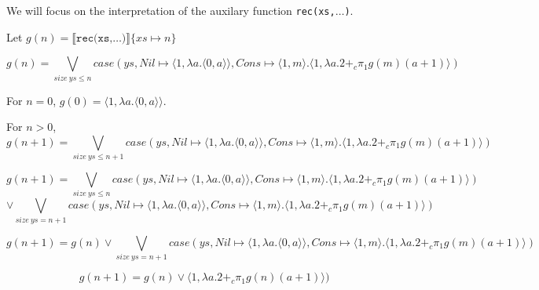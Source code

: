 \documentclass[12pt,letterpaper]{article}
\begin{document}
We will focus on the interpretation of the auxilary function \texttt{rec(xs,$\dots$)}.

Let $g(n) = \llbracket \texttt{rec(xs,$\dots$)} \rrbracket \{xs \mapsto n\}$

\[g(n) = \bigvee_{size\ ys \leq n} case(ys, Nil \mapsto \langle1,\lambda a.\langle 0,a\rangle\rangle, Cons \mapsto \langle 1,m \rangle.\langle 1, \lambda a. 2 +_c \pi_1g(m) (a+1)\rangle)\]

For $n=0$, $g(0) = \langle 1,\lambda a.\langle 0,a\rangle\rangle$.

For $n>0$,
\[g(n+1) = \bigvee_{size\ ys \leq n+1} case(ys, Nil \mapsto \langle1,\lambda a.\langle 0,a\rangle\rangle, Cons \mapsto \langle 1,m \rangle.\langle 1, \lambda a. 2 +_c \pi_1g(m) (a+1)\rangle)\]

\[ g(n+1) = \bigvee_{size\ ys \leq n} case(ys, Nil \mapsto \langle1,\lambda a.\langle 0,a\rangle\rangle, Cons \mapsto \langle 1,m \rangle.\langle 1, \lambda a. 2 +_c \pi_1g(m) (a+1)\rangle) \]
\[ \vee \bigvee_{size\ ys = n+1} case(ys, Nil \mapsto \langle1,\lambda a.\langle 0,a\rangle\rangle, Cons \mapsto \langle 1,m \rangle.\langle 1, \lambda a. 2 +_c \pi_1g(m) (a+1)\rangle) \]
 
\[ g(n+1) = g(n) \vee \bigvee_{size\ ys = n+1} case(ys, Nil \mapsto \langle1,\lambda a.\langle 0,a\rangle\rangle, Cons \mapsto \langle 1,m \rangle.\langle 1, \lambda a. 2 +_c \pi_1g(m) (a+1)\rangle) \]

\[ g(n+1) = g(n) \vee \langle 1, \lambda a. 2 +_c \pi_1g(n) (a+1)\rangle)\]
\end{document}
